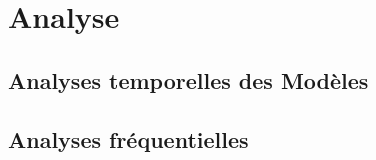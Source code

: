 \chapter{Analyse}
\label{chap:analyse}

\section{Analyses temporelles des Modèles}

\section{Analyses fréquentielles}

